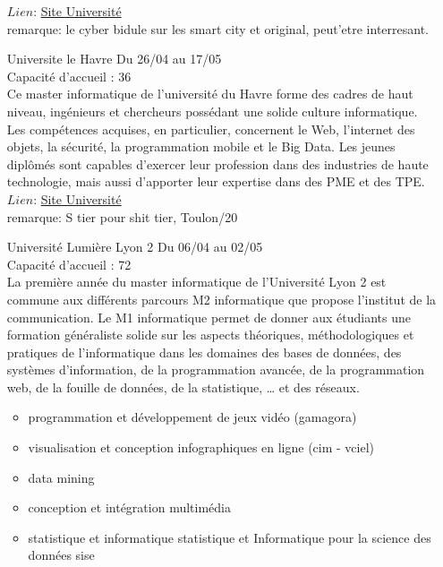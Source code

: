 \documentclass[a4paper,11pt]{article}
\begin{document}
\begin{enumerate}
                    $Lien$: \href{https://depinfo.univ-st-etienne.fr/Master/index.php}{Site Université}
                    \\ remarque: le cyber bidule sur les smart city et original, peut'etre interresant.
\\
        \item [\color{LightOrangeHaf}Universite le Havre] Du 26/04 au 17/05
                    \\Capacité d'accueil : 36
                    \\Ce master informatique de l’université du Havre forme des cadres de haut niveau, ingénieurs et chercheurs possédant une solide culture informatique.  Les compétences acquises, en particulier, concernent le Web, l’internet des objets, la sécurité, la programmation mobile et le Big Data. Les jeunes diplômés sont capables d’exercer leur profession dans des industries de haute technologie, mais aussi d’apporter leur expertise dans des PME et des TPE.
                    $Lien$: \href{https://www.univ-lehavre.fr/spip.php?formation22}{Site Université}
                    \\ remarque: S tier pour shit tier, Toulon/20
\\
        \item [\color{LightOrangeHaf}Université Lumière Lyon 2] Du 06/04 au 02/05
                    \\Capacité d'accueil : 72
                    \\La première année du master informatique de l'Université Lyon 2 est commune aux différents parcours M2 informatique que propose l’institut de la communication. Le M1 informatique permet de donner aux étudiants une formation généraliste solide sur les aspects théoriques, méthodologiques et pratiques de l'informatique dans les domaines des bases de données, des systèmes d'information, de la programmation avancée, de la programmation web, de la fouille de données, de la statistique, … et des réseaux.
                    \begin{itemize}
                        \item programmation et développement de jeux vidéo (gamagora) 
                        \item visualisation et conception infographiques en ligne (cim - vciel) 
                        \item data mining
                        \item conception et intégration multimédia 
                        \item statistique et informatique statistique et Informatique pour la science des données sise 

\end{itemize}
\end{enumerate}
\end{document}
